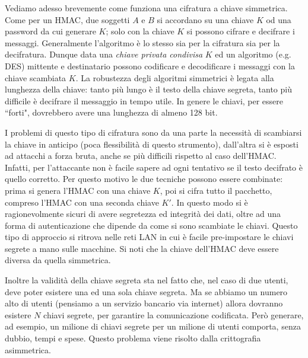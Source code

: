 Vediamo adesso brevemente come funziona una cifratura a chiave simmetrica. Come per un HMAC, due soggetti $A$ e $B$ si accordano su una chiave $K$ od una password da cui generare $K$; solo con la chiave $K$ si possono cifrare e decifrare i messaggi. Generalmente l'algoritmo è lo stesso sia per la cifratura sia per la decifratura. Dunque data una \textit{chiave privata condivisa} $K$ ed un algoritmo (e.g. DES) mittente e destinatario possono codificare e decodificare i messaggi con la chiave scambiata $K$. La robustezza degli algoritmi simmetrici è legata alla lunghezza della chiave: tanto più lungo è il testo della chiave segreta, tanto più difficile è decifrare il messaggio in tempo utile. In genere le chiavi, per essere \textquotedblleft forti", dovrebbero avere una lunghezza di almeno 128 bit.

I problemi di questo tipo di cifratura sono da una parte la necessità di scambiarsi la chiave in anticipo (poca flessibilità di questo strumento), dall'altra si è esposti ad attacchi a forza bruta, anche se più difficili rispetto al caso dell'HMAC. Infatti, per l'attaccante non è facile sapere ad ogni tentativo se il testo decifrato è quello corretto. Per questo motivo le due tecniche possono essere combinate: prima si genera l'HMAC con una chiave $K$, poi si cifra tutto il pacchetto, compreso l'HMAC con una seconda chiave $K'$. In questo modo si è ragionevolmente sicuri di avere segretezza ed integrità dei dati, oltre ad una forma di autenticazione che dipende da come si sono scambiate le chiavi. Questo tipo di approccio si ritrova nelle reti LAN in cui è facile pre-impostare le chiavi segrete a mano sulle macchine. Si noti che la chiave dell'HMAC deve essere diversa da quella simmetrica.

Inoltre la validità della chiave segreta sta nel fatto che, nel caso di due utenti, deve poter esistere una ed una sola chiave segreta. Ma se abbiamo un numero alto di utenti (pensiamo a un servizio bancario via internet) allora dovranno esistere $N$ chiavi segrete, per garantire la comunicazione codificata. Però generare, ad esempio, un milione di chiavi segrete per un milione di utenti comporta, senza dubbio, tempi e spese. Questo problema viene risolto dalla crittografia asimmetrica.

